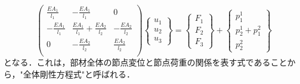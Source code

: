 \documentclass[10pt,a4j]{jarticle}
\begin{document}
\begin{equation}
	\left(
	\begin{array}{ccc}
		\frac{EA_1}{l_1} & -\frac{EA_1}{l_1}  & 0 \\
		-\frac{EA_1}{l_1} & \frac{EA_1}{l_1}+\frac{EA_2}{l_2} & -\frac{EA_2}{l_2} \\
		0 & -\frac{EA_2}{l_2} & \frac{EA_2}{l_2}  \\
	\end{array}
	\right)
	\left\{
	\begin{array}{c}
		u_1 \\
		u_2 \\
		u_3
	\end{array}
	\right\}
	=
	\left\{
	\begin{array}{c}
		F_1 \\
		F_2  \\
		F_3  
	\end{array}
	\right\}
	+
	\left\{
	\begin{array}{c}
		p^1_1 \\
		p^1_2+p^2_1 \\
		p^2_2
	\end{array}
	\right\}
	\label{eqn:FE_eq}
\end{equation}
となる．これは，部材全体の節点変位と節点荷重の関係を表す式であることから，"全体剛性方程式"と呼ばれる．
\end{document}
